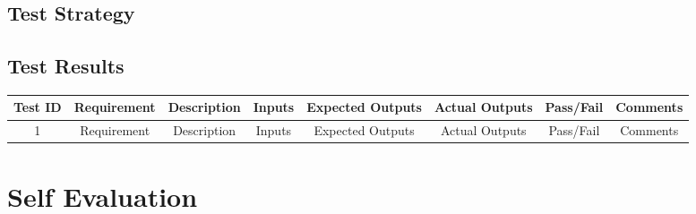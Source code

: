 \documentclass[a4paper,12pt,hidelinks]{report}
\begin{document}
    \section{Test Strategy}

    \newpage
    \begin{landscape}
        \section{Test Results}
        \begin{center}
            \begin{tabular}{ |c|c|c|c|c|c|c|c| } 
                \hline
                \textbf{Test ID} & R\textbf{equirement} & D\textbf{escription} & I\textbf{nputs} & E\textbf{xpected Outputs} & A\textbf{ctual Outputs} & P\textbf{ass/Fail} & \textbf{Comments}
                \\\hline\hline
                1 & Requirement & Description & Inputs & Expected Outputs & Actual Outputs & Pass/Fail & Comments\\ 
                \hline
            \end{tabular}
        \end{center}
    \end{landscape}

    \blindtext
\chapter{Self Evaluation}
    \blindtext

\printbibliography
\end{document}
